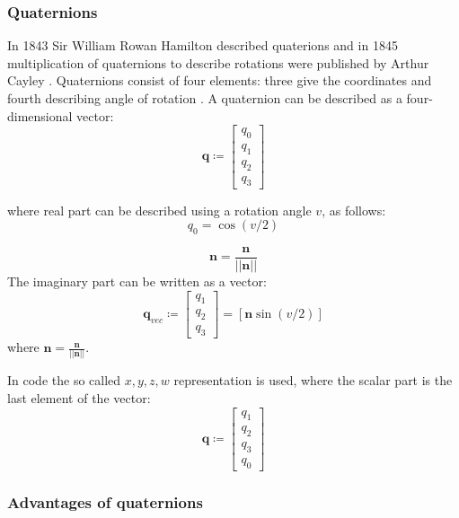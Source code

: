 \documentclass[12pt,a4paper,oneside]{article}
\begin{document}
\subsubsection{Quaternions}

In 1843 Sir William Rowan Hamilton described quaterions \citet{hamilton1844lxxviii} and in 1845 multiplication of quaternions to describe rotations were published by Arthur Cayley \citet{cayley1845xiii}. Quaternions consist of four elements: three give the coordinates and fourth describing angle of rotation \citet{courant1953methods}.
A quaternion can be described as a four-dimensional vector:
\begin{equation}
\bm{q} \coloneqq \begin{bmatrix}
q_0 \\
q_1 \\
q_2 \\
q_3
\end{bmatrix}
\end{equation}

where real part can be described using a rotation angle $v$, as follows:
\begin{equation}
q_0 = \cos(v/2)
\end{equation}

\begin{equation}
\bm{n} = \frac{\bm{n}}{||\bm{n}||}
\end{equation}
The imaginary part can be written as a vector:
\begin{equation}
\bm{q}_{vec} \coloneqq \begin{bmatrix}
q_1 \\
q_2 \\
q_3
\end{bmatrix}
= [\bm{n}\sin(v/2)]
\end{equation}
where $\bm{n} = \frac{\bm{n}}{||\bm{n}||}$.

In code the so called $x,y,z,w$ representation is used, where the scalar part is the last element of the vector:
\begin{equation}
\bm{q} \coloneqq \begin{bmatrix}
q_1 \\
q_2 \\
q_3 \\
q_0
\end{bmatrix}
\end{equation}

\subsubsection{Advantages of quaternions}
\end{document}

